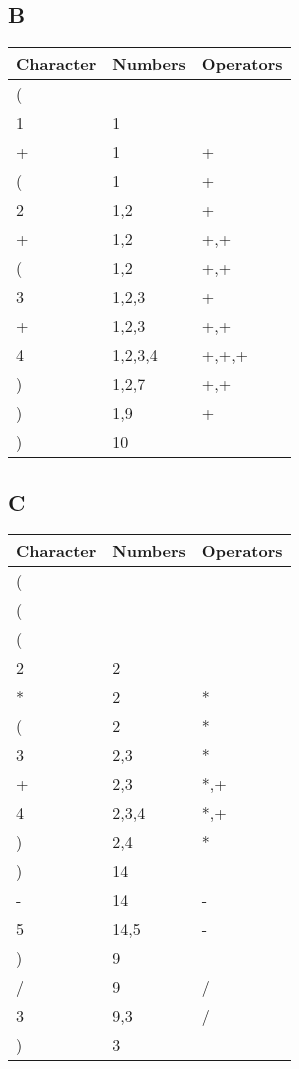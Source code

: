 \documentclass[12pt]{article} %
\begin{document}
\subsection{B}
\begin{tabular}{ | l | l | l |}
\hline
Character & Numbers & Operators  \\ \hline
( & & \\ \hline
1 & 1 & \\ \hline
+ & 1 & + \\ \hline
( & 1 & + \\ \hline
2 & 1,2 & + \\ \hline
+ & 1,2 & +,+  \\ \hline
( & 1,2 & +,+ \\ \hline
3 & 1,2,3 & + \\ \hline
+ & 1,2,3 & +,+ \\ \hline
4 & 1,2,3,4 & +,+,+ \\ \hline
) & 1,2,7 & +,+ \\ \hline
) & 1,9 & + \\ \hline
) & 10 & \\ \hline
\end{tabular}

\subsection{C}
\begin{tabular}{ | l | l | l |}
\hline
Character & Numbers & Operators  \\ \hline
( & & \\ \hline
( & &\\ \hline
( & &\\ \hline
2 & 2 & \\ \hline
* & 2 & * \\ \hline
( & 2 & * \\ \hline
3 & 2,3 & *\\ \hline
+ & 2,3 & *,+ \\ \hline
4 & 2,3,4 & *,+ \\ \hline
) & 2,4 & *\\ \hline
) & 14 &  \\ \hline
- & 14 & - \\ \hline
5 & 14,5 & -\\ \hline
) & 9 & \\ \hline
/ & 9 & / \\ \hline
3 & 9,3 & / \\ \hline
) & 3 & \\ \hline
\end{tabular}
\end{document}
